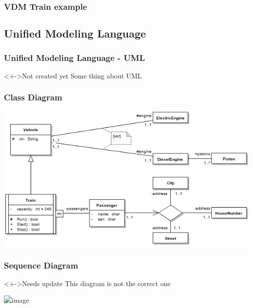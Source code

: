 %
%
\frame
{
  \frametitle{VDM Train example}

\begin{center}


\end{center}
}

\subsection{Unified Modeling Language}
%
%
\frame
{
  \frametitle{Unified Modeling Language - UML}

\begin{center}

	\begin{block}<+->{Not created yet}
	Some thing about UML
	\end{block}

\end{center}
}


%
%
\frame
{
  \frametitle{Class Diagram}

\begin{center}

\includegraphics[width=\textwidth]{images/ClassDiagramOverview.png}

\end{center}
}

%
%
\frame
{
  \frametitle{Sequence Diagram}

	\begin{block}<+->{Needs update}
	This diagram is not the correct one
	\end{block}
\begin{center}
\includegraphics<1->[width=0.5\textwidth]{images/TracesSequenceDiagramEx2.png}%
\end{center}
}
